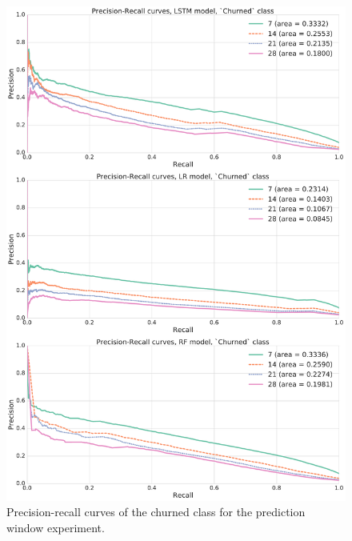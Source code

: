 \documentclass{kththesis}
\begin{document}
\begin{figure}
    \centering
    \includegraphics[width=1.0\textwidth,keepaspectratio]{figures/prc_pred_window.pdf}
    \caption{Precision-recall curves of the churned class for the prediction window experiment.}
    \label{fig:prc_pred_window}
\end{figure}
\end{document}
